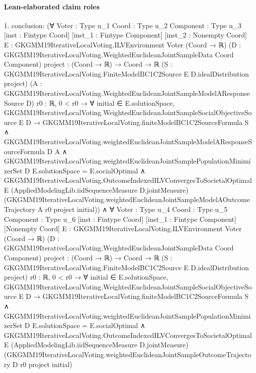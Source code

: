 \documentclass[10pt]{article}
\begin{document}
\paragraph{Lean-elaborated claim roles}\begin{ReviewVerbatim}
1. conclusion: (∀ {Voter : Type u_1} {Coord : Type u_2} {Component : Type u_3} [inst : Fintype Coord] [inst_1 : Fintype Component]
    [inst_2 : Nonempty Coord] {E : GKGMM19IterativeLocalVoting.ILVEnvironment Voter (Coord → ℝ)}
    (D : GKGMM19IterativeLocalVoting.WeightedEuclideanJointSampleData Coord Component)
    {project : (Coord → ℝ) → Coord → ℝ}
    (S : GKGMM19IterativeLocalVoting.FiniteModelBC1C2Source E D.idealDistribution project)
    (A : GKGMM19IterativeLocalVoting.WeightedEuclideanJointSampleModelAResponseSource D) {r0 : ℝ},
    0 < r0 →
      ∀ initial ∈ E.solutionSpace,
        GKGMM19IterativeLocalVoting.WeightedEuclideanJointSampleSocialObjectiveSource E D →
          GKGMM19IterativeLocalVoting.finiteModelBC1C2SourceFormula S ∧
            GKGMM19IterativeLocalVoting.weightedEuclideanJointSampleModelAResponseSourceFormula D A ∧
              GKGMM19IterativeLocalVoting.weightedEuclideanJointSamplePopulationMinimizerSet D E.solutionSpace =
                  E.socialOptimal ∧
                GKGMM19IterativeLocalVoting.OutcomeIndexedILVConvergesToSocietalOptimal E
                  (AppliedModelingLib.iidSequenceMeasure D.jointMeasure)
                  (GKGMM19IterativeLocalVoting.weightedEuclideanJointSampleModelAOutcomeTrajectory A r0 project
                    initial)) ∧
  ∀ {Voter : Type u_4} {Coord : Type u_5} {Component : Type u_6} [inst : Fintype Coord] [inst_1 : Fintype Component]
    [Nonempty Coord] {E : GKGMM19IterativeLocalVoting.ILVEnvironment Voter (Coord → ℝ)}
    (D : GKGMM19IterativeLocalVoting.WeightedEuclideanJointSampleData Coord Component)
    {project : (Coord → ℝ) → Coord → ℝ}
    (S : GKGMM19IterativeLocalVoting.FiniteModelBC1C2Source E D.idealDistribution project) {r0 : ℝ},
    0 < r0 →
      ∀ initial ∈ E.solutionSpace,
        GKGMM19IterativeLocalVoting.WeightedEuclideanJointSampleSocialObjectiveSource E D →
          GKGMM19IterativeLocalVoting.finiteModelBC1C2SourceFormula S ∧
            GKGMM19IterativeLocalVoting.weightedEuclideanJointSamplePopulationMinimizerSet D E.solutionSpace =
                E.socialOptimal ∧
              GKGMM19IterativeLocalVoting.OutcomeIndexedILVConvergesToSocietalOptimal E
                (AppliedModelingLib.iidSequenceMeasure D.jointMeasure)
                (GKGMM19IterativeLocalVoting.weightedEuclideanJointSampleOutcomeTrajectory D r0 project initial)
\end{ReviewVerbatim}
\end{document}
